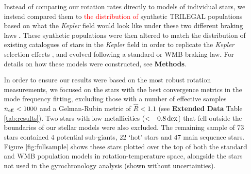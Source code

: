 \documentclass[12pt]{article}
\newcommand{\kepler}{\emph{Kepler}\xspace}
\newcommand{\rtwo}[1]{\textcolor{red}{{#1}}}
\begin{document}
Instead of comparing our rotation rates directly to models of individual stars, we instead compared them to \rtwo{the distribution of} synthetic TRILEGAL populations based on what the \textit{Kepler} field would look like under these two different braking laws \cite{vansaders+2019, girardi+2012}. These synthetic populations were then altered to match the distribution of existing catalogues of stars in the \kepler field in order to replicate the \kepler selection effects \cite{berger+2020}, and evolved following a standard or WMB braking law. For details on how these models were constructed, see \textbf{Methods}.

In order to ensure our results were based on the most robust rotation measurements, we focused on the stars with the best convergence metrics in the mode frequency fitting, excluding those with a number of effective samples $n_{\rm eff} < 1000$ and a Gelman-Rubin metric of $\hat{R}<1.1$ \cite{gelman+rubin1992,salvatier+2016} (see \textbf{Extended Data} Table \ref{tab:results}). Two stars with low metallicities ($< -0.8\, \rm {dex}$) that fell outside the boundaries of our stellar models were also excluded. The remaining sample of 73 stars contained 4 potential sub-giants, 22 `hot' stars and 47 main sequence stars. Figure \ref{fig:fullsample} shows these stars plotted over the top of both the standard and WMB population models in rotation-temperature space, alongside the stars not used in the gyrochronology analysis (shown without uncertainties).
\end{document}
